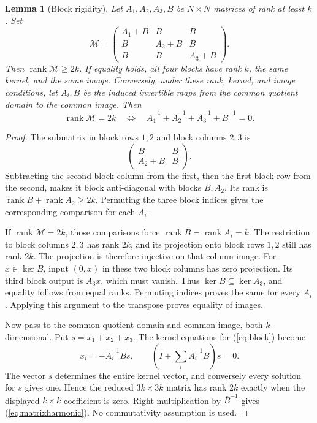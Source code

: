 \documentclass[11pt,letterpaper]{article}
\newtheorem{lemma}[theorem]{Lemma}
\theoremstyle{definition}\newtheorem{definition}[theorem]{Definition}
\theoremstyle{remark}\newtheorem{remark}[theorem]{Remark}
\DeclareMathOperator{\rank}{rank}
\begin{document}
\begin{lemma}[Block rigidity]\label{lem:block}
Let $A_1,A_2,A_3,B$ be $N\times N$ matrices of rank at least $k$. Set
\begin{equation}\label{eq:block}
\mathcal M=
\begin{pmatrix}
A_1+B&B&B\\ B&A_2+B&B\\ B&B&A_3+B
\end{pmatrix}.
\end{equation}
Then $\rank\mathcal M\geq2k$. If equality holds, all four blocks have rank $k$, the same kernel, and the same image. Conversely, under these rank, kernel, and image conditions, let $\bar A_i,\bar B$ be the induced invertible maps from the common quotient domain to the common image. Then
\begin{equation}\label{eq:matrixharmonic}
\rank\mathcal M=2k
\quad\Longleftrightarrow\quad
\bar A_1^{-1}+\bar A_2^{-1}+\bar A_3^{-1}+\bar B^{-1}=0.
\end{equation}
\end{lemma}
\begin{proof}
The submatrix in block rows $1,2$ and block columns $2,3$ is
\[
\begin{pmatrix}B&B\\A_2+B&B\end{pmatrix}.
\]
Subtracting the second block column from the first, then the first block row from the second, makes it block anti-diagonal with blocks $B,A_2$. Its rank is $\rank B+\rank A_2\geq2k$. Permuting the three block indices gives the corresponding comparison for each $A_i$.

If $\rank\mathcal M=2k$, those comparisons force $\rank B=\rank A_i=k$. The restriction to block columns $2,3$ has rank $2k$, and its projection onto block rows $1,2$ still has rank $2k$. The projection is therefore injective on that column image. For $x\in\ker B$, input $(0,x)$ in these two block columns has zero projection. Its third block output is $A_3x$, which must vanish. Thus $\ker B\subseteq\ker A_3$, and equality follows from equal ranks. Permuting indices proves the same for every $A_i$. Applying this argument to the transpose proves equality of images.

Now pass to the common quotient domain and common image, both $k$-dimensional. Put $s=x_1+x_2+x_3$. The kernel equations for (\ref{eq:block}) become
\[
x_i=-\bar A_i^{-1}\bar B s,\qquad
\left(I+\sum_i\bar A_i^{-1}\bar B\right)s=0.
\]
The vector $s$ determines the entire kernel vector, and conversely every solution for $s$ gives one. Hence the reduced $3k\times3k$ matrix has rank $2k$ exactly when the displayed $k\times k$ coefficient is zero. Right multiplication by $\bar B^{-1}$ gives (\ref{eq:matrixharmonic}). No commutativity assumption is used.
\end{proof}
\end{document}
